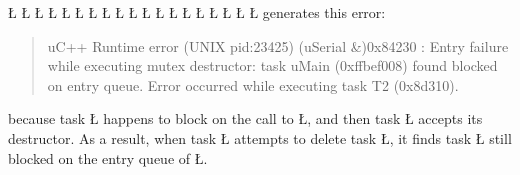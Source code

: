 \documentclass[openright,twoside]{report}
\begin{document}
\L{}
\L{}
\L{\LB{}}
\L{}
\L{\LB{}}
\L{\LB{\};}}
\endlgrinde\LGend
\LGinlinefalse\LGbegin\lgrinde
\L{}
\L{\LB{}}
\L{}
\L{\LB{}}
\L{}
\L{\LB{}}
\L{\LB{\};}}
\endlgrinde\LGend
\LGinlinefalse\LGbegin\lgrinde
\L{}
\L{\LB{}}
\L{\LB{}}
\L{\LB{}}
\L{\LB{}}
\L{\LB{\}}}
\endlgrinde\LGend
generates this error:
\begin{quote}
\BGfont
uC++ Runtime error (UNIX pid:23425) (uSerial \&)0x84230 : Entry failure while executing mutex destructor: task uMain (0xffbef008) found blocked on entry queue.
Error occurred while executing task T2 (0x8d310).
\end{quote}
because task \LGinlinetrue\LGbegin\lgrinde\L{}\endlgrinde\LGend{} happens to block on the call to \LGinlinetrue\LGbegin\lgrinde\L{}\endlgrinde\LGend{}, and then task \LGinlinetrue\LGbegin\lgrinde\L{}\endlgrinde\LGend{} accepts its destructor.
As a result, when task \LGinlinetrue\LGbegin\lgrinde\L{}\endlgrinde\LGend{} attempts to delete task \LGinlinetrue\LGbegin\lgrinde\L{}\endlgrinde\LGend{}, it finds task \LGinlinetrue\LGbegin\lgrinde\L{}\endlgrinde\LGend{} still blocked on the entry queue of \LGinlinetrue\LGbegin\lgrinde\L{}\endlgrinde\LGend{}.
\end{document}
